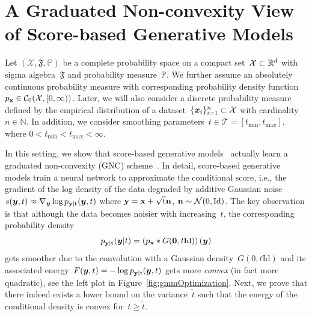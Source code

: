 \documentclass{article}
\newcommand{\N}{\mathbb{N}}
\renewcommand{\P}{\mathbb{P}}
\newcommand{\C}{\mathcal{C}}
\newcommand{\X}{\mathcal{X}}
\newcommand{\T}{\mathcal{T}}
\newcommand{\id}{\mathrm{Id}}
\renewcommand{\vec}[1]{\mathbf{#1}}
\newcommand{\tmin}{t_\mathrm{min}}
\newcommand{\tmax}{t_\mathrm{max}}
\newcommand{\pdf}[1]{p_{#1}}
\theoremstyle{plain}
\theoremstyle{definition}
\theoremstyle{remark}
\begin{document}


\section{A Graduated Non-convexity View of Score-based Generative Models} \label{sec:gnc}
Let $(\X,\mathfrak{F},\P)$ be a complete probability space on a compact set~$\X\subset\R^d$ with sigma algebra~$\mathfrak{F}$ and probability measure~$\P$.
We further assume an absolutely continuous probability measure with corresponding probability density function~$\pdf{\rvx}\in \C_0(\X,[0,\infty))$.
Later, we will also consider a discrete probability measure defined by the empirical distribution of a dataset~$\{\vx_i\}_{i=1}^n\subset\X$ with cardinality~$n\in\N$.
In addition, we consider smoothing parameters~$t\in\T=[\tmin,\tmax]$, where $0<\tmin<\tmax<\infty$.

In this setting, we show that score-based generative models~\citep{SoEr19,HoJa20} actually learn a graduated non-convexity (GNC) scheme~\citep{BlZi87}.
In detail, score-based generative models train a neural network to approximate the conditional score, i.e., the gradient of the log density of the data degraded by additive Gaussian noise~$s(\vy,t)\approx\nabla_\vy\log\pdf{\rvy\vert\rt}(\vy,t)$ where ${\mathbf{y}}={\mathbf{x}}+\sqrt{{\textnormal{t}}}{\mathbf{n}}$, $\rvn\sim\mathcal{N}(0,\id)$.
The key observation is that although the data becomes noisier with increasing~$t$, the corresponding probability density
\[
\pdf{\rvy\vert\rt}(\vy\vert t)=\left(\pdf{\rvx}\ast G(\vec{0},t\id)\right)(\vy)
\]
gets smoother due to the convolution with a Gaussian density~$G(0,t\id)$ and its associated energy~$F(\vy,t)=-\log\pdf{\rvy\vert\rt}(\vy,t)$ gets more \emph{convex} (in fact more quadratic), see the left plot in Figure~\ref{fig:gmmOptimization}.
Next, we prove that there indeed exists a lower bound on the variance~$\widetilde{t}$ such that the energy of the conditional density is convex for~$t\geq\widetilde{t}$.
\end{document}
